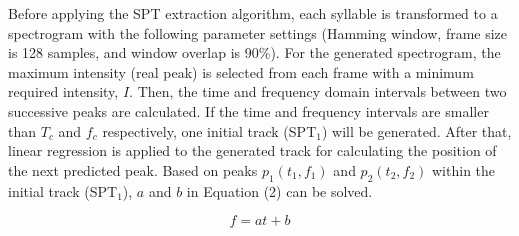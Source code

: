 \begin{table}[htb!]
\centering
\caption{Parameters used for spectral peak extraction}
\label{tab:SPT}
\end{table}

Before applying the SPT extraction algorithm, each syllable is transformed to a spectrogram with the following parameter settings (Hamming window, frame size is 128 samples, and window overlap is 90\%). For the generated spectrogram, the maximum intensity (real peak) is selected from each frame with a minimum required intensity, $I$. Then, the time and frequency domain intervals between two successive peaks are calculated. If the time and frequency intervals are smaller than $T_{c}$ and $f_{c}$ respectively, one initial track (SPT$_{1}$) will be generated. After that, linear regression is applied to the generated track for calculating the position of the next predicted peak. Based on peaks $p_{1}(t_{1},f_{1})$ and $p_{2}(t_{2},f_{2})$ within the initial track (SPT$_{1}$), $a$ and $b$ in Equation (2) can be solved. 

\begin{equation}
f= at+b
\end{equation}

